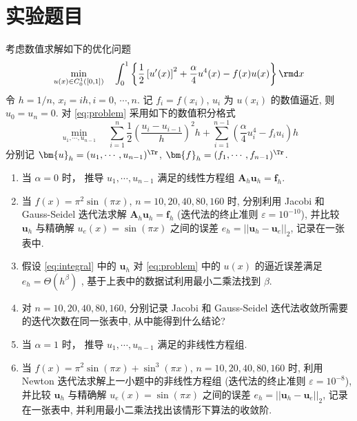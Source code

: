\documentclass{nedsart}
\begin{document}
\maketitle

\tableofcontents

\section{实验题目}

\def\uh{\bm{u}_h}
\def\fh{\bm{f}_h}
\def\Ah{\bm{A}_h}

考虑数值求解如下的优化问题
\begin{equation}\label{eq:problem}
    \min_{u(x) \in C^1_0([0,1])} \quad {\int^1_0 \left\{ \frac{1}{2} \left[ u'(x) \right]^2 + \frac{\alpha}{4} u^4(x) - f(x)u(x) \right\} \rmd x} \\ 
\end{equation}
令 $h=1/n$, $x_i=ih,i=0$, $\cdots,n$. 记 $f_i = f(x_i)$, $u_i$ 为 $u(x_i)$ 的数值逼近, 则 $u_0 = u_n = 0$.  对 \eqref{eq:problem} 采用如下的数值积分格式
\begin{equation}\label{eq:integral}
    \min_{u_1, \cdots, u_{n-1}} \quad \sum^n_{i=1} {\frac{1}{2} \left( \frac{u_i - u_{i-1}}{h} \right)^2 h } + \sum^{n-1}_{i=1} {  \left( \frac{\alpha}{4} u^4_i - f_i u_i \right) h}
\end{equation}
分别记 $\uh=(u_1,\cdots,u_{n-1})^\Tr$, $\fh=(f_1,\cdots,f_{n-1})^\Tr$.
\begin{enumerate}
    \item 当 $\alpha = 0$ 时， 推导 $u_1,\cdots,u_{n-1}$ 满足的线性方程组 $\Ah \uh = \fh$.
    \item 当 $f(x) = \pi^2 \sin(\pi x)$, $n = 10, 20, 40, 80, 160$ 时, 分别利用 Jacobi 和 Gauss-Seidel 迭代法求解 $\Ah \uh = \fh$ (迭代法的终止准则 $\varepsilon = 10^{-10}$), 并比较 $\uh$ 与精确解 $u_e(x) = \sin(\pi x)$ 之间的误差 $e_h = ||\uh - \bm{u}_e||_2$, 记录在一张表中.
    \item 假设 \eqref{eq:integral} 中的 $\uh$ 对 \eqref{eq:problem} 中的 $u(x)$ 的逼近误差满足 $e_h = \Theta(h^\beta)$ , 基于上表中的数据试利用最小二乘法找到 $\beta$.
    \item 对 $n = 10, 20, 40, 80, 160$, 分别记录 Jacobi 和 Gauss-Seidel 迭代法收敛所需要的迭代次数在同一张表中, 从中能得到什么结论?
    \item 当 $\alpha = 1$ 时， 推导 $u_1,\cdots,u_{n-1}$ 满足的非线性方程组.
    \item 当 $f(x) = \pi^2 \sin(\pi x) + \sin^3(\pi x)$, $n = 10, 20, 40, 80, 160$ 时, 利用 Newton 迭代法求解上一小题中的非线性方程组 (迭代法的终止准则 $\varepsilon = 10^{-8}$), 并比较 $\uh$ 与精确解 $u_e(x) = \sin(\pi x)$ 之间的误差 $e_h = ||\uh - \bm{u}_e||_2$, 记录在一张表中, 并利用最小二乘法找出该情形下算法的收敛阶.
\end{enumerate}
\end{document}
